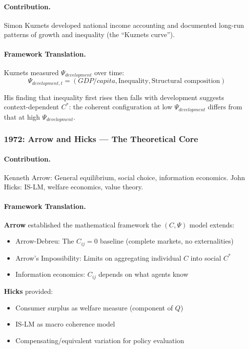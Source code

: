 \paragraph{Contribution.}
Simon Kuznets developed national income accounting and documented
long-run patterns of growth and inequality (the ``Kuznets curve'').

\paragraph{Framework Translation.}
Kuznets measured $\Psi_{development}$ over time:
\begin{equation}
  \Psi_{development,t} = (GDP/capita, \text{Inequality}, \text{Structural composition})
\end{equation}

His finding that inequality first rises then falls with development
suggests context-dependent $C^*$: the coherent configuration
at low $\Psi_{development}$ differs from that at high $\Psi_{development}$.

\subsubsection{1972: Arrow and Hicks --- The Theoretical Core}

\paragraph{Contribution.}
Kenneth Arrow: General equilibrium, social choice, information economics.
John Hicks: IS-LM, welfare economics, value theory.

\paragraph{Framework Translation.}
\textbf{Arrow} established the mathematical framework the $(C, \Psi)$ model extends:
\begin{itemize}
  \item Arrow-Debreu: The $C_{ij} = 0$ baseline (complete markets, no externalities)
  \item Arrow's Impossibility: Limits on aggregating individual $C$ into social $C^*$
  \item Information economics: $C_{ij}$ depends on what agents know
\end{itemize}

\textbf{Hicks} provided:
\begin{itemize}
  \item Consumer surplus as welfare measure (component of $Q$)
  \item IS-LM as macro coherence model
  \item Compensating/equivalent variation for policy evaluation
\end{itemize}


